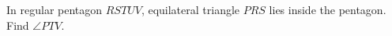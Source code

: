 In regular pentagon $RSTUV$, equilateral triangle $PRS$ lies inside the pentagon. Find $\angle PTV$.
